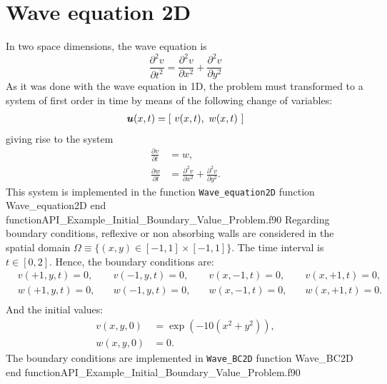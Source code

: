 \section{Wave equation 2D}
In two space dimensions, the wave equation is
      \begin{equation*}      	
      \frac{\partial^2 v}{\partial t^2} =  \frac{\partial^2 v}{\partial x^2} +  \frac{\partial^2 v}{\partial y^2} 
      \end{equation*}
As it was done with the wave equation in 1D, the problem must transformed to a system of first order in time by means of the following change of variables:      
      \begin{align*}  
           \boldsymbol{u}(x, t) = [ \ v(x,t), \ w(x,t) \ ]
        \end{align*}
giving rise to the system    
      \begin{align*}  
      \frac{\partial v}{\partial t} & = w,   \\	
      \frac{\partial w}{\partial t} & =  \frac{\partial^2 v}{\partial x^2} + \frac{\partial^2 v}{\partial y^2}.
      \end{align*}
This system is implemented in the function \verb|Wave_equation2D|  
\vspace{0.5cm} 
      {function Wave_equation2D}
      {end function}{API_Example_Initial_Boundary_Value_Problem.f90}      
Regarding boundary conditions, reflexive or non absorbing walls are considered in  
the spatial domain $\Omega \equiv \{ (x,y) \in [-1,1] \times [-1,1] \}$. The  time interval is $t \in [0,2]$. 
Hence, the boundary conditions are: 
\begin{align*}  
      & v(+1,y,t)  =0, \quad & v(-1,y,t)  =0, \quad &  v(x,-1,t) =0, \quad &  v(x,+1,t) =0,   \\	
       & w(+1,y,t)  =0, \quad &  w(-1,y,t)  =0, \quad &  w(x,-1,t) =0, \quad &   w(x,+1,t)  =0.   \\	
      \end{align*}  
And the initial values:
      \begin{align*}  
      v(x,y,0) & = \exp(-10 (x^2+y^2)),   \\	
      w(x,y,0) & = 0. 
      \end{align*}
The  boundary conditions are implemented in \verb|Wave_BC2D| 
\vspace{0.5cm} 
      {function Wave_BC2D}
      {end function}{API_Example_Initial_Boundary_Value_Problem.f90} 
     

